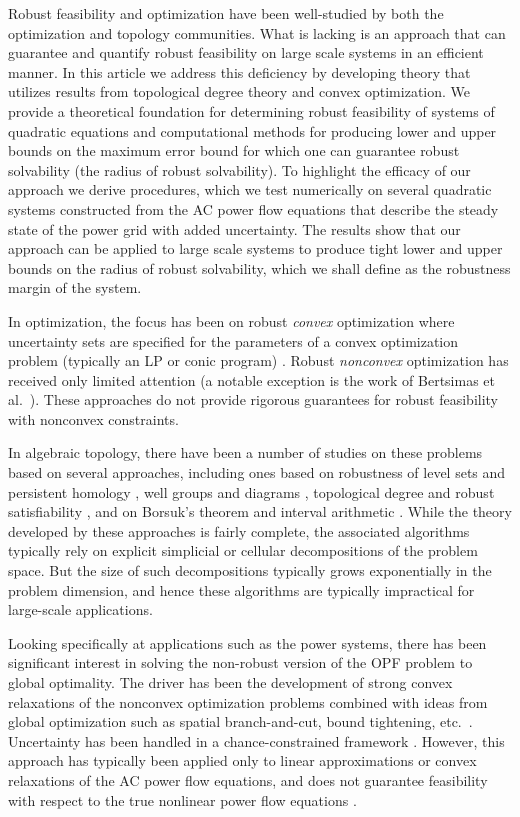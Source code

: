 Robust feasibility and optimization have been well-studied by both the optimization and topology communities. 
What is lacking is an approach that can guarantee and quantify robust feasibility on large scale systems in an efficient manner. 
In this article we address this deficiency by developing theory that utilizes results from topological degree theory and convex optimization. 
We provide a theoretical foundation for determining robust feasibility of systems of quadratic equations and computational methods for producing lower and upper bounds on the maximum error bound for which one can guarantee robust solvability (the radius of robust solvability). 
To highlight the efficacy of our approach we derive procedures, which we test numerically on several quadratic systems constructed from the AC power flow equations that describe the steady state of the power grid with added uncertainty. 
The results show that our approach can be applied to large scale systems to produce tight lower and upper bounds on the radius of robust solvability, which we shall define as the robustness margin of the system.

In optimization, the focus has been on robust \emph{convex} optimization where uncertainty sets are specified for the parameters of a convex optimization problem (typically an LP or conic program) \cite{ben2009robust}.
Robust \emph{nonconvex} optimization has received only limited attention (a notable exception is the work of Bertsimas et al.~\cite{BeNoTe2010}).
These approaches do not provide rigorous guarantees for robust feasibility with nonconvex constraints.

In algebraic topology, there have been a number of studies on these problems based on several approaches, including ones based on robustness of level sets and persistent homology \cite{BeEdMoPa2010,EdMoPa2011}, well groups and diagrams \cite{ChSkPa2012,FrKr2016well,FrKr2016pers}, topological degree and robust satisfiability \cite{FrKr2015,FrKrWa2016},  and on Borsuk's theorem and interval arithmetic \cite{FrRa2015,FrHoLa2007,FrLa2005}.
While the theory developed by these approaches is fairly complete, the associated algorithms typically rely on explicit simplicial or cellular decompositions of the problem space.
But the size of such decompositions typically grows exponentially in the problem dimension, and hence these algorithms are typically impractical for large-scale applications.

Looking specifically at applications such as the power systems, there has been significant interest in solving the non-robust version of the OPF problem to global optimality.
The driver has been the development of strong convex relaxations of the nonconvex optimization problems combined with ideas from global optimization such as spatial branch-and-cut, bound tightening, etc.~\cite{BiMu2016,coffrin2015strengthening}.
Uncertainty has been handled in a chance-constrained framework \cite{BiChHa2014,zhang2011chance}.
However, this approach has typically been applied only to linear approximations or convex relaxations of the AC power flow equations, and does not guarantee feasibility with respect to the true nonlinear power flow equations \cite{BiChHa2014,kocuk2016strong,RoVrOlAn2015,TsBiTa2016}.

